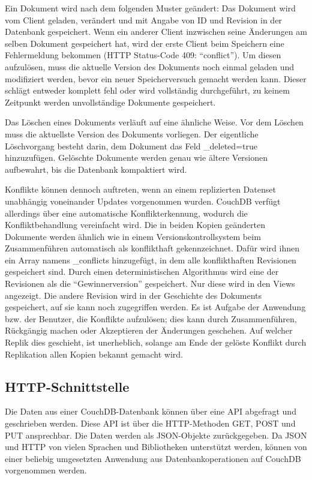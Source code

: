 Ein Dokument wird nach dem folgenden Muster geändert: Das Dokument wird vom Client geladen, verändert und mit Angabe von ID und Revision in der Datenbank gespeichert. Wenn ein anderer Client inzwischen seine Änderungen am selben Dokument gespeichert hat, wird der erste Client beim Speichern eine Fehlermeldung bekommen (HTTP Status-Code 409: \enquote{conflict}). Um diesen aufzulösen, muss die aktuelle Version des Dokuments noch einmal geladen und modifiziert werden, bevor ein neuer Speicherversuch gemacht werden kann. Dieser schlägt entweder komplett fehl oder wird vollständig durchgeführt, zu keinem Zeitpunkt werden unvollständige Dokumente gespeichert. 

Das Löschen eines Dokuments verläuft auf eine ähnliche Weise. Vor dem Löschen muss die aktuellste Version des Dokuments vorliegen. Der eigentliche Löschvorgang besteht darin, dem Dokument das Feld {\selectfont \_deleted=true} hinzuzufügen. Gelöschte Dokumente werden genau wie ältere Versionen aufbewahrt, bis die Datenbank kompaktiert wird.

Konflikte können dennoch auftreten, wenn an einem replizierten Datenset unabhängig voneinander Updates vorgenommen wurden. CouchDB verfügt allerdings über eine automatische Konflikterkennung, wodurch die Konfliktbehandlung vereinfacht wird. Die in beiden Kopien geänderten Dokumente werden ähnlich wie in einem Versionskontrollsystem beim Zusammenführen automatisch als konflikthaft gekennzeichnet. Dafür wird ihnen ein Array namens {\selectfont \_conflicts} hinzugefügt, in dem alle konflikthaften Revisionen gespeichert sind. Durch einen deterministischen Algorithmus wird eine der Revisionen als die \enquote{Gewinnerversion} gespeichert. Nur diese wird in den Views angezeigt. Die andere Revision wird in der Geschichte des Dokuments gespeichert, auf sie kann noch zugegriffen werden. Es ist Aufgabe der Anwendung bzw. der Benutzer, die Konflikte aufzulösen; dies kann durch Zusammenführen, Rückgängig machen oder Akzeptieren der Änderungen geschehen. Auf welcher Replik dies geschieht, ist unerheblich, solange am Ende der gelöste Konflikt durch Replikation allen Kopien bekannt gemacht wird.





\subsection{HTTP-Schnittstelle}
\label{subsec:api}

Die Daten aus einer CouchDB-Datenbank können über eine API abgefragt und geschrieben werden. Diese API ist über die HTTP-Methoden GET, POST und PUT ansprechbar. Die Daten werden als JSON-Objekte zurückgegeben. Da JSON und HTTP von vielen Sprachen und Bibliotheken unterstützt werden, können von einer beliebig umgesetzten Anwendung aus Datenbankoperationen auf CouchDB vorgenommen werden. 

